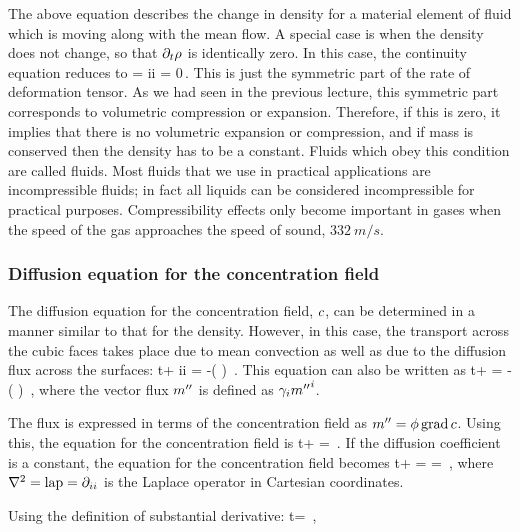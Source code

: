 The above equation describes the change in density for a material element of fluid which is moving along with the mean flow. A special case is when the density does not change, so that $\partial_{t}\rho$ is identically zero. In this case, the continuity equation reduces to
\beq
\div\vel = \ipd i\fvec\vel i = 0\,.
\eeq
This is just the symmetric part of the rate of deformation tensor. As we had seen in the previous lecture, this symmetric part corresponds to volumetric compression or expansion. Therefore, if this is zero, it implies that there is no volumetric expansion or compression, and if mass is conserved then the density has to be a constant. Fluids which obey this condition are called  fluids. Most fluids that we use in practical applications are incompressible fluids; in fact all liquids can be considered incompressible for practical purposes. Compressibility effects only become important in gases when the speed of the gas approaches the speed of sound, $\SI{332}{m/s}$.


\subsubsection{Diffusion equation for the concentration field}
The diffusion equation for the concentration field, $c$, can be determined in a manner similar to that for the density. However, in this case, the transport across the cubic faces takes place due to mean convection as well as due to the diffusion flux across the surfaces:
\beq
\ipd t\conc + \ipd i\conc\fvec\vel i = -\left( \div\flux\mass \right) \,.
\eeq
This equation can also be written as
\beq
\ipd t\conc + \gder\iprod\conc\vel = -\left( \div\flux\mass \right) \,,
\eeq
where the vector flux ${m}^{\prime\prime}$ is defined as $\gamma_{i}{{m}^{\prime\prime}}^{i}$.

The flux is expressed in terms of the concentration field as ${m}^{\prime\prime} = \phi\operatorname{grad}c$. Using this, the equation for the concentration field is
\beq
\ipd t\conc + \gder\iprod\conc\vel = \gder\iprod\kdiff\gder\conc \,.
\eeq
If the diffusion coefficient is a constant, the equation for the concentration field becomes
\beq
\ipd t\conc + \gder\iprod\conc\vel = \kdiff\lder\conc = \kdiff\lap\conc \,,
\eeq
where $\nabla^2 = \operatorname{lap} = \partial_{ii}$ is the Laplace operator in Cartesian coordinates.

Using the definition of substantial derivative:
\beq
\iod t\conc = \kdiff\lap\conc \,,
\eeq

